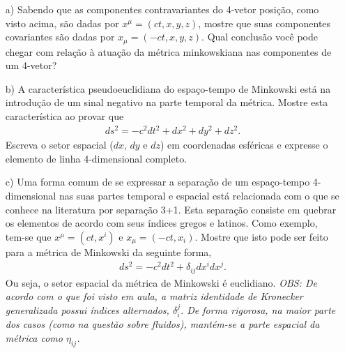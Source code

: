 \documentclass[a4paper,12pt]{article}
\begin{document}
\begin{itemize}
 \item[a)] Sabendo que as componentes contravariantes do 4-vetor posição, como visto acima, são dadas por $x^{\mu}=(ct,x,y,z)$, mostre que suas componentes covariantes são dadas por $x_{\mu}=(-ct,x,y,z)$. Qual conclusão você pode chegar com relação à atuação da métrica minkowskiana nas componentes de um 4-vetor?
 \item[b)] A característica pseudoeuclidiana do espaço-tempo de Minkowski está na introdução de um sinal negativo na parte temporal da métrica. Mostre esta característica ao provar que
 \begin{eqnarray}
 \nonumber
 ds^2 = -c^2 dt^2 + dx^2 + dy^2 + dz^2.
 \end{eqnarray}
%
\noindent Escreva o setor espacial ($dx$, $dy$ e $dz$) em coordenadas esféricas e expresse o elemento de linha 4-dimensional completo.
 \item[c)] Uma forma comum de se expressar a separação de um espaço-tempo 4-dimensional nas suas partes temporal e espacial está relacionada com o que se conhece na literatura por separação 3+1. Esta separação consiste em quebrar os elementos de acordo com seus índices gregos e latinos. Como exemplo, tem-se que $x^{\mu}=(ct, x^{i})$ e $x_{\mu}=(-ct, x_{i})$. Mostre que isto pode ser feito para a métrica de Minkowski da seguinte forma, 
 \begin{eqnarray}
 \nonumber
 ds^2 = -c^2 dt^2 + \delta_{ij}dx^{i} dx^{j}.
 \end{eqnarray}
 \noindent Ou seja, o setor espacial da métrica de Minkowski é euclidiano. {\it{OBS: De acordo com o que foi visto em aula, a matriz identidade de Kronecker generalizada possui índices alternados, $\delta_{i}^{j}$. De forma rigorosa, na maior parte dos casos (como na questão sobre fluidos), mantém-se a parte espacial da métrica como $\eta_{ij}$.}}\\  
\end{itemize}
%
%
%

\end{document}
